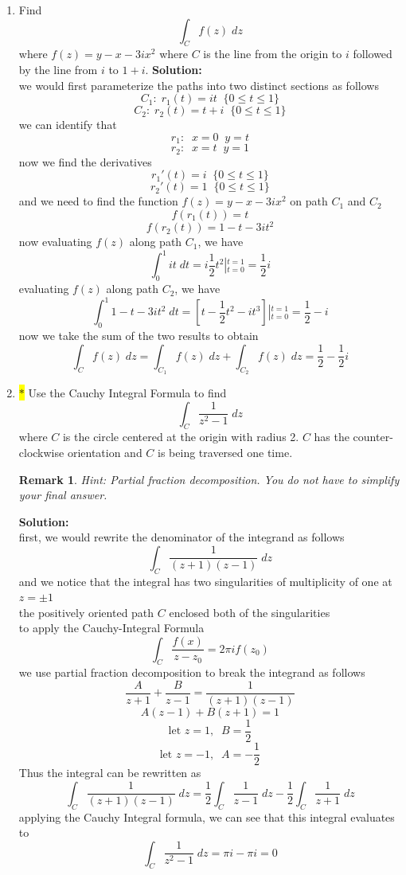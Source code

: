 \documentclass[12pt]{article}
\newtheorem*{remark}{Remark}
\begin{document}
\begin{enumerate}
\item Find 
\[
\int_{C} f(z) \; dz
\]
where $f(z) = y-x - 3ix^{2}$ where $C$ is the line from the origin to $i$ followed by the line from $i$ to $1+i$.  
\textbf{Solution:}\\
we would first parameterize the paths into two distinct sections as follows
\[
C_1: \; r_1(t)=it \;\; \{0\leq t \leq 1\}
\]
\[
C_2: \; r_2(t)=t+i \;\; \{0\leq t \leq 1\}
\]
we can identify that
\[
r_1: \;\; x=0 \;\; y=t
\]
\[
r_2: \;\; x=t \;\; y=1
\]
now we find the derivatives
\[
r_1'(t)=i \;\; \{0\leq t \leq 1\}
\]
\[
r_2'(t)=1 \;\; \{0\leq t \leq 1\}
\]
and we need to find the function $f(z)=y-x-3ix^2$ on path $C_1$ and $C_2$
\[
f(r_1(t))=t
\]
\[
f(r_2(t))=1-t-3it^2
\]
now evaluating $f(z)$ along path $C_1$, we have
\[
\int_{0}^{1} it \; dt = i\frac{1}{2}t^2\left|_{t=0}^{t=1} \right.=\frac{1}{2}i
\]
evaluating $f(z)$ along path $C_2$, we have
\[
\int_{0}^{1} 1-t-3it^2 \; dt = \left[ t-\frac{1}{2}t^2-it^3 \right]\left|_{t=0}^{t=1}  \right. = \frac{1}{2}-i
\]
now we take the sum of the two results to obtain
\[
\int_C f(z)\;dz = \int_{C_1} f(z)\;dz + \int_{C_2} f(z)\;dz = \frac{1}{2}-\frac{1}{2}i
\]






    \item  \colorbox{yellow}{$\ast$}  Use the Cauchy Integral Formula to find 
    \[
    \int_{C} \frac{1}{z^{2} -1} \; dz
    \]
    where $C$ is the circle centered at the origin with radius 2.  $C$ has the counter-clockwise orientation and $C$ is being traversed one time.  

\begin{remark}
Hint:  Partial fraction decomposition.  You do not have to simplify your final answer.        
\end{remark}
\textbf{Solution:}\\
first, we would rewrite the denominator of the integrand as follows
\[
\int_{C} \frac{1}{(z+1)(z-1)} \; dz
\]
and we notice that the integral has two singularities of multiplicity of one at $z=\pm 1$
\\
the positively oriented path $C$ enclosed both of the singularities
\\
to apply the Cauchy-Integral Formula
\[
\int_{C} \frac{f(x)}{z-z_0}=2\pi i f(z_0)
\]
we use partial fraction decomposition to break the integrand as follows 
\[
\frac{A}{z+1} + \frac{B}{z-1} = \frac{1}{(z+1)(z-1)}
\]
\[
A(z-1)+B(z+1)=1
\]
\[
\text{let }z=1, \;\; B=\frac{1}{2}
\]
\[
\text{let }z=-1, \;\; A=-\frac{1}{2}
\]
Thus the integral can be rewritten as
\[
\int_{C} \frac{1}{(z+1)(z-1)} \; dz = \frac{1}{2} \int_{C} \frac{1}{z-1} \; dz - \frac{1}{2} \int_{C} \frac{1}{z+1}\; dz
\]
applying the Cauchy Integral formula, we can see that this integral evaluates to
\[
\int_{C} \frac{1}{z^{2} -1} \; dz = \pi i - \pi i = 0
\]
\newline


\end{enumerate}
\end{document}
